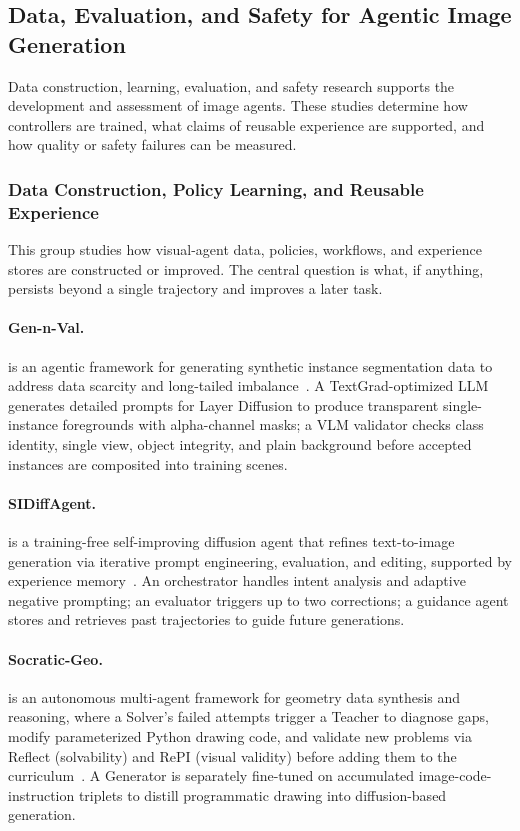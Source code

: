 \subsection{Data, Evaluation, and Safety for Agentic Image Generation}
Data construction, learning, evaluation, and safety research supports the development and assessment of image agents. These studies determine how controllers are trained, what claims of reusable experience are supported, and how quality or safety failures can be measured.

\subsubsection{Data Construction, Policy Learning, and Reusable Experience}
This group studies how visual-agent data, policies, workflows, and experience stores are constructed or improved. The central question is what, if anything, persists beyond a single trajectory and improves a later task.

\paragraph{Gen-n-Val.}
 is an agentic framework for generating synthetic instance segmentation data to address data scarcity and long-tailed imbalance~\cite{huang2025gennval}. A TextGrad-optimized LLM generates detailed prompts for Layer Diffusion to produce transparent single-instance foregrounds with alpha-channel masks; a VLM validator checks class identity, single view, object integrity, and plain background before accepted instances are composited into training scenes. 

\paragraph{SIDiffAgent.}
 is a training-free self-improving diffusion agent that refines text-to-image generation via iterative prompt engineering, evaluation, and editing, supported by experience memory~\cite{avg260202051}. An orchestrator handles intent analysis and adaptive negative prompting; an evaluator triggers up to two corrections; a guidance agent stores and retrieves past trajectories to guide future generations.



\paragraph{Socratic-Geo.}
 is an autonomous multi-agent framework for geometry data synthesis and reasoning, where a Solver's failed attempts trigger a Teacher to diagnose gaps, modify parameterized Python drawing code, and validate new problems via Reflect (solvability) and RePI (visual validity) before adding them to the curriculum~\cite{avg260203414}. A Generator is separately fine-tuned on accumulated image-code-instruction triplets to distill programmatic drawing into diffusion-based generation. 

